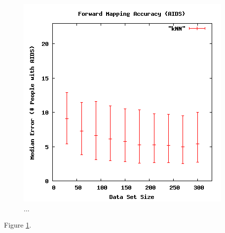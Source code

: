 \begin{figure}[ht]
\centering
\includegraphics[scale=.5]{images/results_aids/aids-fmacc.png}
\caption{...}
\label{fig:aidsfmacc}
\end{figure}

Figure \ref{fig:aidsfmacc}.


